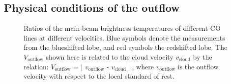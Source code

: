 \subsection{Physical conditions of the outflow}

\begin{figure}[tbp]
\caption{Ratios of the main-beam brightness temperatures of different CO lines at different velocities. Blue symbols denote the measurements from the blueshifted lobe, and red symbols the redshifted lobe. The $V_{\mathrm{outflow}}$ shown here is related to the cloud velocity $v_{\mathrm{cloud}}$ by the relation: $V_{\mathrm{outflow}}$ = $\mid$ $v_{\mathrm{outflow}}$ - $v_{\mathrm{cloud}}\mid$, where $v_{\mathrm{outflow}}$ is the outflow velocity with respect to the local standard of rest. \label{fig:figratio}}
\end{figure}

